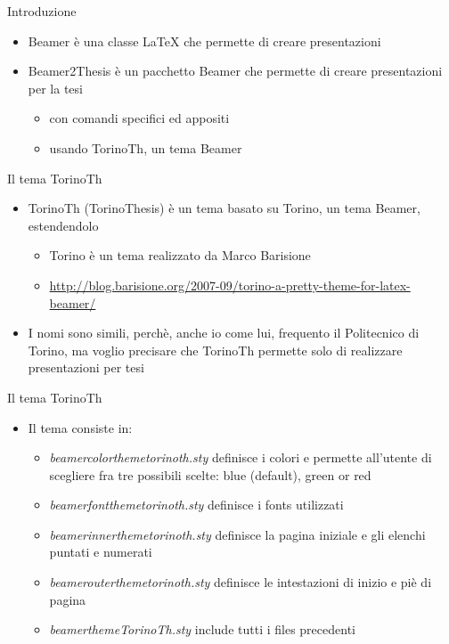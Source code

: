 \titlepageframe %

\begin{tframe}{Introduzione}
\begin{itemize}
\item Beamer è una classe \LaTeX{} che permette di creare presentazioni
\item Beamer2Thesis è un pacchetto Beamer che permette di creare presentazioni per la tesi
\begin{itemize}
\item con comandi specifici ed appositi
\item usando TorinoTh, un tema Beamer
\end{itemize}
\end{itemize}
\end{tframe}

\begin{tframe}{Il tema TorinoTh}
\begin{itemize}
\item TorinoTh (TorinoThesis) è un tema basato su Torino, un tema Beamer, estendendolo
\begin{itemize}
\item Torino è un tema realizzato da Marco Barisione
\item \href{http://blog.barisione.org/2007-09/torino-a-pretty-theme-for-latex-beamer/}{http://blog.barisione.org/2007-09/torino-a-pretty-theme-for-latex-beamer/}
\end{itemize}
\item I nomi sono simili, perchè, anche io come lui, frequento il Politecnico di Torino, ma voglio precisare che TorinoTh permette solo di realizzare presentazioni per tesi
\end{itemize}
\end{tframe}

\begin{tframe}{Il tema TorinoTh}
\begin{itemize}
\item Il tema consiste in:
\begin{itemize}
\item \emph{beamercolorthemetorinoth.sty} definisce i colori e permette all'utente di scegliere fra tre possibili scelte: blue (default), green or red
\item \emph{beamerfontthemetorinoth.sty} definisce i fonts utilizzati
\item \emph{beamerinnerthemetorinoth.sty} definisce la pagina iniziale e gli elenchi puntati e numerati
\item \emph{beamerouterthemetorinoth.sty} definisce le intestazioni di inizio e piè di pagina
\item \emph{beamerthemeTorinoTh.sty} include tutti i files precedenti
\end{itemize}
\end{itemize}
\end{tframe}

